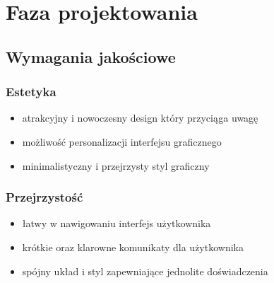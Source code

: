 \newcommand{\tabeladwiekolumnywiersz}[2]{
    \parbox[c][1em][c]{\textwidth}{
        #1
    } &
    \parbox[c][2.5em][c]{\textwidth}{
        #2
    }
    \\
    \hline
}

\newcommand{\tabeladwiekolumny}[3]{
    \begin{center}
        \begin{tabularx}{1\textwidth} {
                | >{\hsize=#1\hsize}X
                | >{\hsize=#2\hsize}X |}
            \hline

            #3
        \end{tabularx}
    \end{center}
}

\newcommand{\tabeladwiekolumnywykres}[3]{
    \tabeladwiekolumnywiersz{
        #1
    }{
        \rule{30.3em / #3 * #2}{1.2em}
    }
}

\section{Faza projektowania}

\subsection{Wymagania jakościowe}

\subsubsection{Estetyka}

\begin{itemize}[leftmargin=*]
    \item atrakcyjny i nowoczesny design który przyciąga uwagę
    \item możliwość personalizacji interfejsu graficznego
    \item minimalistyczny i przejrzysty styl graficzny
\end{itemize}

\subsubsection{Przejrzystość}

\begin{itemize}[leftmargin=*]
    \item łatwy w nawigowaniu interfejs użytkownika
    \item krótkie oraz klarowne komunikaty dla użytkownika
    \item spójny układ i styl zapewniające jednolite doświadczenia
\end{itemize}

